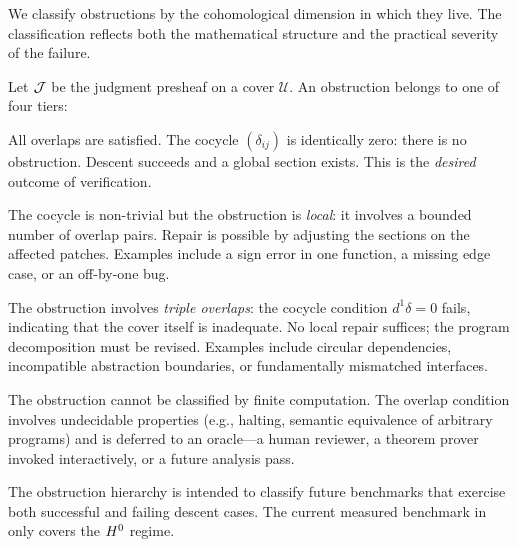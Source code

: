 \documentclass[11pt]{article}
\begin{document}
We classify obstructions by the cohomological dimension in which they live.
The classification reflects both the mathematical structure and the practical
severity of the failure.

\begin{definition}\label{def:hierarchy}
Let $\mathcal{J}$ be the judgment presheaf on a cover $\mathcal{U}$.  An obstruction
belongs to one of four tiers:
\begin{description}[style=nextline, leftmargin=2.5cm]
\item[$\Hcoh{0}$ --- Fully discharged.]
  All overlaps are satisfied.  The cocycle $(\delta_{ij})$ is identically
  zero: there is no obstruction.  Descent succeeds and a global section
  exists.  This is the \emph{desired} outcome of verification.

\item[$\Hcoh{1}$ --- Overlap gap (repairable).]
  The cocycle is non-trivial but the obstruction is \emph{local}: it
  involves a bounded number of overlap pairs.  Repair is possible by
  adjusting the sections on the affected patches.  Examples include a
  sign error in one function, a missing edge case, or an off-by-one bug.

\item[$\Hcoh{2}$ --- Structural (requires redesign).]
  The obstruction involves \emph{triple overlaps}: the cocycle condition
  $d^1 \delta = 0$ fails, indicating that the cover itself is
  inadequate.  No local repair suffices; the program decomposition
  must be revised.  Examples include circular dependencies, incompatible
  abstraction boundaries, or fundamentally mismatched interfaces.

\item[$H^{\infty}$ --- Oracle-deferred.]
  The obstruction cannot be classified by finite computation.  The
  overlap condition involves undecidable properties (e.g., halting,
  semantic equivalence of arbitrary programs) and is deferred to an
  oracle---a human reviewer, a theorem prover invoked interactively,
  or a future analysis pass.
\end{description}
\end{definition}

\begin{remark}
The obstruction hierarchy is intended to classify future benchmarks that
exercise both successful and failing descent cases.  The current measured
benchmark in  only covers the $\Hcoh{0}$ regime.
\end{remark}
\end{document}
